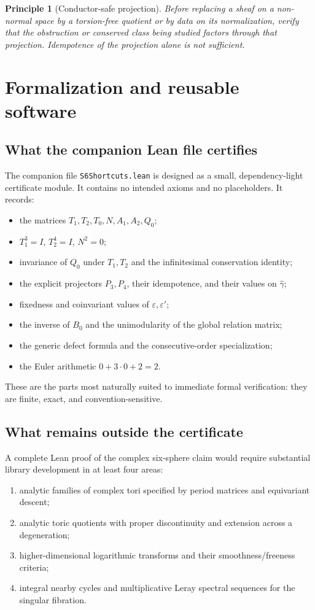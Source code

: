 \documentclass[11pt,reqno]{amsart}
\numberwithin{equation}{section}
\newcommand{\eps}{\varepsilon}
\newcommand{\epsp}{\varepsilon'}
\newcommand{\wideg}{\widehat\gamma}
\newtheorem{principle}[theorem]{Principle}
\theoremstyle{definition}
\begin{document}
\begin{principle}[Conductor-safe projection]\label{pr:conductor-safe}
Before replacing a sheaf on a non-normal space by a torsion-free quotient or by data on its normalization, verify that the obstruction or conserved class being studied factors through that projection. Idempotence of the projection alone is not sufficient.
\end{principle}

\section{Formalization and reusable software}\label{sec:formalization}

\subsection{What the companion Lean file certifies}

The companion file \texttt{S6Shortcuts.lean} is designed as a small, dependency-light certificate module. It contains no intended axioms and no placeholders. It records:
\begin{itemize}
\item the matrices $T_1,T_2,T_0,N,A_1,A_2,Q_0$;
\item $T_1^3=I$, $T_2^4=I$, $N^2=0$;
\item invariance of $Q_0$ under $T_1,T_2$ and the infinitesimal conservation identity;
\item the explicit projectors $P_3,P_4$, their idempotence, and their values on $\wideg$;
\item fixedness and coinvariant values of $\eps,\epsp$;
\item the inverse of $B_0$ and the unimodularity of the global relation matrix;
\item the generic defect formula and the consecutive-order specialization;
\item the Euler arithmetic $0+3\cdot0+2=2$.
\end{itemize}

These are the parts most naturally suited to immediate formal verification: they are finite, exact, and convention-sensitive.

\subsection{What remains outside the certificate}

A complete Lean proof of the complex six-sphere claim would require substantial library development in at least four areas:
\begin{enumerate}
\item analytic families of complex tori specified by period matrices and equivariant descent;
\item analytic toric quotients with proper discontinuity and extension across a degeneration;
\item higher-dimensional logarithmic transforms and their smoothness/freeness criteria;
\item integral nearby cycles and multiplicative Leray spectral sequences for the singular fibration.
\end{enumerate}
\end{document}
